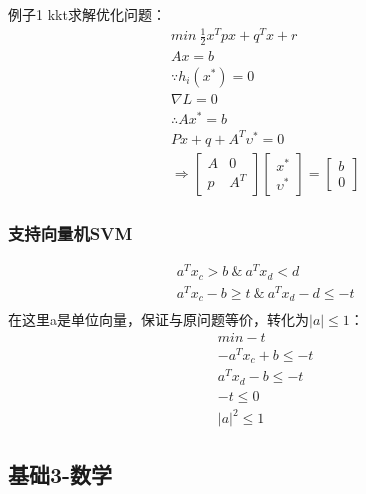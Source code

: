 \documentclass[UTF8]{../computerUniverse}
\begin{document}
例子1 kkt求解优化问题：
\begin{equation}
\begin{split}
&min\ \frac{1}{2}x^Tpx+q^Tx+r\\
&Ax=b\\
&\because h_i(x^*)=0\\
&\nabla L=0\\
&\therefore Ax^*=b\\
& Px+q+A^T \upsilon^*=0\\
&\Rightarrow \begin{bmatrix}
A &0\\ p& A^T
\end{bmatrix}
\begin{bmatrix}
x^* \\ \upsilon ^*
\end{bmatrix}=
\begin{bmatrix}
b\\0
\end{bmatrix}
\end{split}
\end{equation}

\subsubsection{支持向量机SVM}
\begin{equation}
\begin{split}
&a^Tx_c>b \ \& \ a^Tx_d<d\\
&a^Tx_c-b\geqslant t \ \& \ a^Tx_d-d\leqslant -t\\
\end{split}
\end{equation}
在这里a是单位向量，保证与原问题等价，转化为$|a|\leqslant1$：
\begin{equation}
    \begin{split}
    &min -t\\
    &-a^Tx_c+b\leqslant-t\\
    &a^Tx_d-b \leqslant -t\\
    &-t\leqslant0\\
    &|a|^2\leqslant1
    \end{split}
\end{equation}


\subsection{基础3-数学}
\end{document}
